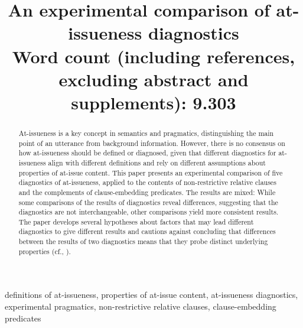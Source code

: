 \documentclass[times,linguex]{glossa}
\title[Comparing at-issueness diagnostics]{An experimental comparison of at-issueness diagnostics\\ 
\bigskip \large
Word count (including references, excluding abstract and supplements): 9.303
}
\author[]%
{%
}
\begin{document}
\maketitle
\begin{abstract}
  At-issueness is a key concept in semantics and pragmatics, distinguishing the main point of an utterance from background information. However, there is no consensus on how at-issueness should be defined or diagnosed, given that different diagnostics for at-issueness align with different definitions and rely on different assumptions about properties of at-issue content. This paper presents an experimental comparison of five diagnostics of at-issueness, applied to the contents of non-restrictive relative clauses and the complements of clause-embedding predicates. The results are mixed: While some comparisons of the results of diagnostics reveal differences, suggesting that the diagnostics are not interchangeable, other comparisons yield more consistent results. The paper develops several hypotheses about factors that may lead different diagnostics to give different results and cautions against concluding that differences between the results of two diagnostics means that they probe distinct underlying properties (cf., \citealt{snider_anaphoric_2017,koev_notions_2018}).
\end{abstract}

\begin{keywords} definitions of at-issueness, properties of at-issue content, at-issueness diagnostics, experimental pragmatics, non-restrictive relative clauses, clause-embedding predicates
\end{keywords}

\end{document}
